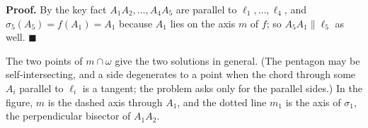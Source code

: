 \textbf{Proof.} By the key fact $A_1A_2,\dots,A_4A_5$ are parallel to $\ell_1,\dots,\ell_4$, and $\sigma_5(A_5)=f(A_1)=A_1$ because $A_1$ lies on the axis $m$ of $f$; so $A_5A_1\parallel\ell_5$ as well. $\blacksquare$

The two points of $m\cap\omega$ give the two solutions in general. (The pentagon may be self-intersecting, and a side degenerates to a point when the chord through some $A_i$ parallel to $\ell_i$ is a tangent; the problem asks only for the parallel sides.) In the figure, $m$ is the dashed axis through $A_1$, and the dotted line $m_1$ is the axis of $\sigma_1$, the perpendicular bisector of $A_1A_2$.
